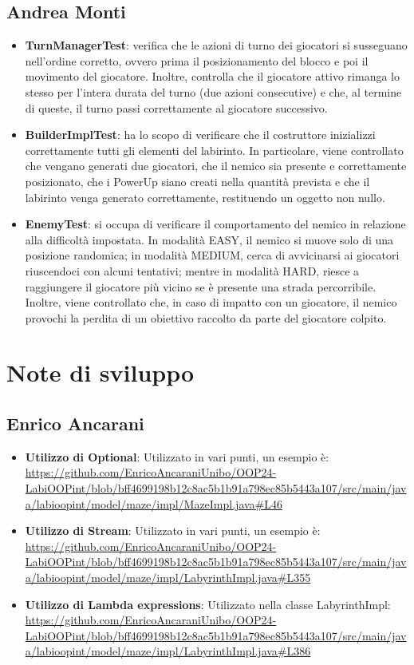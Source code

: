 \documentclass[a4paper,12pt]{report}
\begin{document}
\subsection{Andrea Monti}
\begin{itemize}
	\item \textbf{TurnManagerTest}: verifica che le azioni di turno dei giocatori si susseguano nell’ordine corretto, 
	ovvero prima il posizionamento del blocco e poi il movimento del giocatore. 
	Inoltre, controlla che il giocatore attivo rimanga lo stesso per l’intera durata del turno (due azioni consecutive) e 
	che, al termine di queste, il turno passi correttamente al giocatore successivo.
	\item \textbf{BuilderImplTest}: ha lo scopo di verificare che il costruttore inizializzi correttamente 
	tutti gli elementi del labirinto. In particolare, viene controllato che vengano generati due giocatori, che il nemico 
	sia presente e correttamente posizionato, che i PowerUp siano creati nella quantità prevista e che il labirinto venga 
	generato correttamente, restituendo un oggetto non nullo.
	\item \textbf{EnemyTest}: si occupa di verificare il comportamento del nemico in relazione alla difficoltà impostata. 
	In modalità EASY, il nemico si muove solo di una posizione randomica; in modalità MEDIUM, cerca di avvicinarsi ai 
	giocatori riuscendoci con alcuni tentativi; mentre in modalità HARD, riesce a raggiungere il giocatore più vicino se è 
	presente una strada percorribile. Inoltre, viene controllato che, in caso di impatto con un giocatore, il nemico provochi 
	la perdita di un obiettivo raccolto da parte del giocatore colpito.
\end{itemize}

\section{Note di sviluppo}

\subsection{Enrico Ancarani}
\begin{itemize}
	\item \textbf{Utilizzo di Optional}: Utilizzato in vari punti, un esempio è: \url{https://github.com/EnricoAncaraniUnibo/OOP24-LabiOOPint/blob/bff4699198b12c8ac5b1b91a798ec85b5443a107/src/main/java/labioopint/model/maze/impl/MazeImpl.java#L46}
	\item \textbf{Utilizzo di Stream}: Utilizzato in vari punti, un esempio è: \url{https://github.com/EnricoAncaraniUnibo/OOP24-LabiOOPint/blob/bff4699198b12c8ac5b1b91a798ec85b5443a107/src/main/java/labioopint/model/maze/impl/LabyrinthImpl.java#L355}
	\item \textbf{Utilizzo di Lambda expressions}: Utilizzato nella classe LabyrinthImpl: \url{https://github.com/EnricoAncaraniUnibo/OOP24-LabiOOPint/blob/bff4699198b12c8ac5b1b91a798ec85b5443a107/src/main/java/labioopint/model/maze/impl/LabyrinthImpl.java#L386}
\end{itemize}
\end{document}
